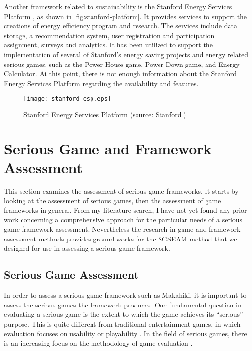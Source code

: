 Another framework related to sustainability is the Stanford Energy Services Platform \cite{Armel-2012}, as shown in \autoref{fig:stanford-platform}. It provides services to support the creations of energy efficiency program and research. The services include data storage, a recommendation system, user registration and participation assignment, surveys and analytics. It has been utilized to support the implementation of several of Stanford's energy saving projects and energy related serious games, such as the Power House game, Power Down game, and Energy Calculator. At this point, there is not enough information about the Stanford Energy Services Platform regarding the availability and features. 

\begin{figure}[ht!]
	\centering
		\texttt{[image: stanford-esp.eps]}
		\caption{Stanford Energy Services Platform (source: Stanford \cite{Armel-2012})}
		\label{fig:stanford-platform}
\end{figure}
 
\section{Serious Game and Framework Assessment}
\label{sec:rel-sg-assessment}

This section examines the assessment of serious game frameworks. It starts by looking at the assessment of serious games, then  the assessment of game frameworks in general. From my literature search, I have not yet found any prior work concerning a comprehensive approach for the particular needs of a serious game framework assessment. Nevertheless the research in game and framework assessment methods provides ground works for the SGSEAM method that we designed for use in assessing a serious game framework.

\subsection{Serious Game Assessment}

In order to assess a serious game framework such as Makahiki, it is important to assess the serious games the framework produces.  One fundamental question in evaluating a serious game is the extent to which the
game achieves its ``serious'' purpose.  This is quite different from traditional entertainment games, in which evaluation focuses on usability or playability \cite{song2007new}. In the field of serious games, there is an increasing focus on the methodology of game evaluation \cite{Mayer2012233}. 

